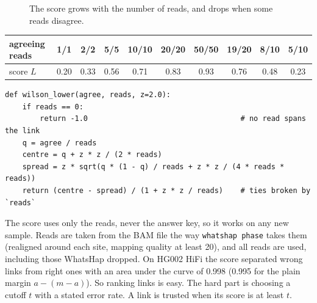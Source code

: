 \documentclass[11pt]{article}
\newcommand{\code}[1]{\texttt{#1}}
\begin{document}
\begin{figure}[h]
\centering
{}
\caption{The score grows with the number of reads, and drops when some reads
disagree.}
\label{fig:wilson}
\end{figure}

\begin{center}
\small
\begin{tabular}{@{}lccccccccc@{}}
\toprule
agreeing reads & 1/1 & 2/2 & 5/5 & 10/10 & 20/20 & 50/50 & 19/20 & 8/10 & 5/10\\
\midrule
score $L$ & 0.20 & 0.33 & 0.56 & 0.71 & 0.83 & 0.93 & 0.76 & 0.48 & 0.23\\
\bottomrule
\end{tabular}
\end{center}

\begin{lstlisting}
def wilson_lower(agree, reads, z=2.0):
    if reads == 0:
        return -1.0                                   # no read spans the link
    q = agree / reads
    centre = q + z * z / (2 * reads)
    spread = z * sqrt(q * (1 - q) / reads + z * z / (4 * reads * reads))
    return (centre - spread) / (1 + z * z / reads)    # ties broken by `reads`
\end{lstlisting}

The score uses only the reads, never the answer key, so it works on any
new sample. Reads are taken from the BAM file the way \code{whatshap phase}
takes them (realigned around each site, mapping quality at least 20), and
all reads are used, including those WhatsHap dropped. On HG002 HiFi the
score separated wrong links from right ones with an area under the curve of
0.998 (0.995 for the plain margin $a-(m-a)$). So ranking links is easy. The
hard part is choosing a cutoff $t$ with a stated error rate. A link is
trusted when its score is at least $t$.
\end{document}
